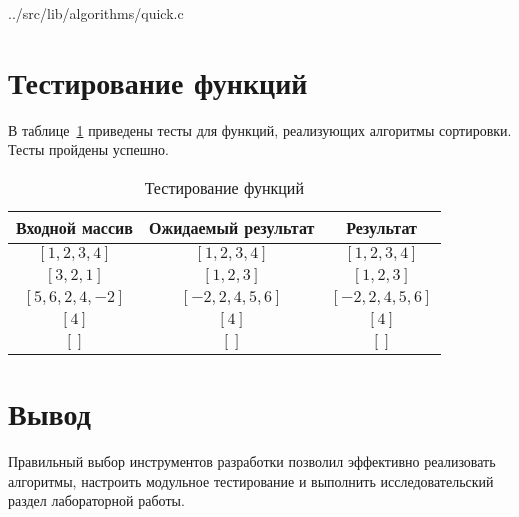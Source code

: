 \begin{lstinputlisting}[
	caption={Пример реализации бенчмарка},
	label={lst:benches},
	style={c},
	linerange={100-109}
]{../src/lib/algorithms/quick.c}
\end{lstinputlisting}



\section{Тестирование функций}

В таблице~\ref{tbl:test} приведены тесты для функций, реализующих алгоритмы сортировки. Тесты пройдены успешно.

\begin{table}[h!]
	\begin{center}
		\begin{tabular}{|c|c|c|}
			\hline
			Входной массив & Ожидаемый результат & Результат \\ 
			\hline
			$[1,2,3,4]$ & $[1,2,3,4]$  & $[1,2,3,4]$\\
			$[3,2,1]$  & $[1,2,3]$ & $[1,2,3]$\\
			$[5,6,2,4,-2]$  & $[-2,2,4,5,6]$  & $[-2,2,4,5,6]$\\
			$[4]$  & $[4]$  & $[4]$\\
			$[]$  & $[]$  & $[]$\\
			\hline
		\end{tabular}
		\caption{\label{tbl:test}Тестирование функций}
	\end{center}
\end{table}

\section*{Вывод}

Правильный выбор инструментов разработки позволил эффективно реализовать алгоритмы, настроить модульное тестирование и выполнить исследовательский раздел лабораторной работы.

